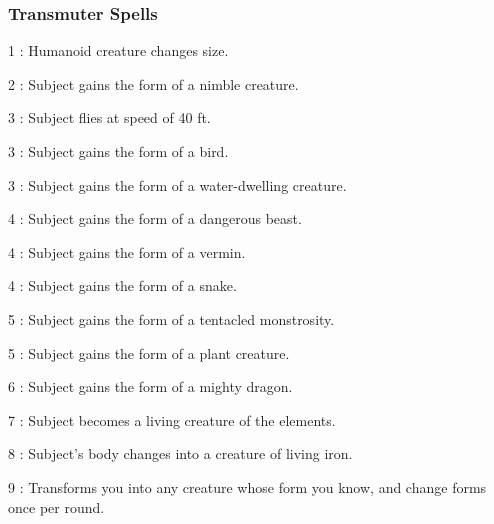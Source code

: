 \subsubsection{Transmuter Spells}
\begin{list}{}{\leftmargin=1em}
\item[1] : Humanoid creature changes size.
\item[2] : Subject gains the form of a nimble creature.
\item[3] : Subject flies at speed of 40 ft.
\item[3] : Subject gains the form of a bird.
\item[3] : Subject gains the form of a water-dwelling creature.
\item[4] : Subject gains the form of a dangerous beast.
\item[4] : Subject gains the form of a vermin.
\item[4] : Subject gains the form of a snake.
\item[5] : Subject gains the form of a tentacled monstrosity.
\item[5] : Subject gains the form of a plant creature.
\item[6] : Subject gains the form of a mighty dragon.
\item[7] : Subject becomes a living creature of the elements.
\item[8] : Subject's body changes into a creature of living iron.
\item[9] : Transforms you into any creature whose form you know, and change forms once per round.
\end{list}







